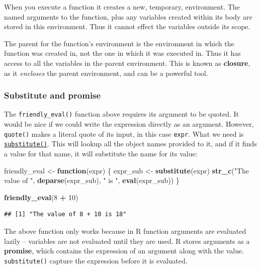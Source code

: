 \documentclass[]{book}
\newenvironment{Shaded}{\begin{snugshade}}{\end{snugshade}}
\newcommand{\ControlFlowTok}[1]{\textcolor[rgb]{0.13,0.29,0.53}{\textbf{#1}}}
\newcommand{\DecValTok}[1]{\textcolor[rgb]{0.00,0.00,0.81}{#1}}
\newcommand{\KeywordTok}[1]{\textcolor[rgb]{0.13,0.29,0.53}{\textbf{#1}}}
\newcommand{\NormalTok}[1]{#1}
\newcommand{\OperatorTok}[1]{\textcolor[rgb]{0.81,0.36,0.00}{\textbf{#1}}}
\newcommand{\StringTok}[1]{\textcolor[rgb]{0.31,0.60,0.02}{#1}}
\begin{document}
When you execute a function it creates a new, temporary, environment. The named arguments
to the function, plus any variables created within its body are stored in this environment.
Thus it cannot effect the variables outside its scope.

The parent for the function's environment is the environment in which the function was
created in, not the one in which it was executed in. Thus it has access to all the
variables in the parent environment. This is known as \textbf{closure}, as it \emph{encloses} the
parent environment, and can be a powerful tool.

\hypertarget{substitute-and-promise}{%
\subsubsection{Substitute and promise}\label{substitute-and-promise}}

The \texttt{friendly\_eval()} function above requires its argument to be quoted. It would be nice
if we could write the expression directly as an argument. However, \texttt{quote()} makes a
literal quote of its input, in this case \texttt{expr}. What we need is
\href{https://www.rdocumentation.org/packages/base/topics/substitute}{\texttt{substitute()}}. This will
lookup all the object names provided to it, and if it finds a value for that name, it will
substitute the name for its value:

\begin{Shaded}
\begin{Highlighting}[]
\NormalTok{friendly_eval <-}\StringTok{ }\ControlFlowTok{function}\NormalTok{(expr) \{}
\NormalTok{  expr_sub <-}\StringTok{ }\KeywordTok{substitute}\NormalTok{(expr)}
  \KeywordTok{str_c}\NormalTok{(}\StringTok{"The value of "}\NormalTok{, }\KeywordTok{deparse}\NormalTok{(expr_sub), }\StringTok{" is "}\NormalTok{, }\KeywordTok{eval}\NormalTok{(expr_sub))}
\NormalTok{\}}

\KeywordTok{friendly_eval}\NormalTok{(}\DecValTok{8} \OperatorTok{+}\StringTok{ }\DecValTok{10}\NormalTok{)}
\end{Highlighting}
\end{Shaded}

\begin{verbatim}
## [1] "The value of 8 + 10 is 18"
\end{verbatim}

The above function only works because in R function arguments are evaluated lazily --
variables are not evaluated until they are used. R stores arguments as a \textbf{promise},
which contains the expression of an argument along with the value. \texttt{substitute()}
capture the expression before it is evaluated.
\end{document}
